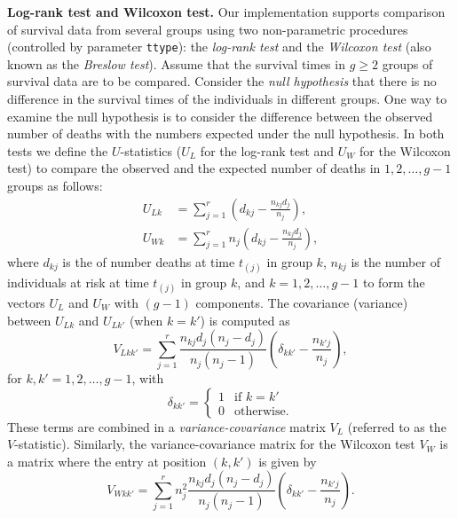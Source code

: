 \textbf{Log-rank test and Wilcoxon test.}
Our implementation supports comparison of survival data from several groups using two non-parametric procedures (controlled by parameter {\tt ttype}): the {\it log-rank test} and the {\it Wilcoxon test} (also known as the {\it Breslow test}). 
Assume that the survival times in $g\geq 2$ groups of survival data are to be compared. 
Consider the {\it null hypothesis} that there is no difference in the survival times of the individuals in different groups. One way to examine the null hypothesis is to consider the difference between the observed number of deaths with the numbers expected under the null hypothesis.  
In both tests we define the $U$-statistics ($U_{L}$ for the log-rank test and $U_{W}$ for the Wilcoxon test) to compare the observed and the expected number of deaths in $1,2,\ldots,g-1$ groups as follows:
\begin{align*}
U_{Lk} &= \sum_{j=1}^{r}\left( d_{kj} - \frac{n_{kj}d_j}{n_j} \right), \\
U_{Wk} &= \sum_{j=1}^{r}n_j\left( d_{kj} - \frac{n_{kj}d_j}{n_j} \right),
\end{align*}
where $d_{kj}$ is the of number deaths at time $t_{(j)}$ in group $k$, 
$n_{kj}$ is the number of individuals at risk at time $t_{(j)}$ in group $k$, and 
$k=1,2,\ldots,g-1$ to form the vectors $U_L$ and $U_W$ with $(g-1)$ components.
The covariance (variance) between $U_{Lk}$ and $U_{Lk'}$ (when $k=k'$) is computed as
\begin{equation*}
V_{Lkk'}=\sum_{j=1}^{r} \frac{n_{kj}d_j(n_j-d_j)}{n_j(n_j-1)} \left( \delta_{kk'}-\frac{n_{k'j}}{n_j} \right),
\end{equation*}
for $k,k'=1,2,\ldots,g-1$, with
\begin{equation*}
\delta_{kk'} = 
\begin{cases}
1 & \text{if } k=k'\\
0 & \text{otherwise.}
\end{cases}
\end{equation*}
These terms are combined in a {\it variance-covariance} matrix $V_L$ (referred to as the $V$-statistic).
Similarly, the variance-covariance matrix for the Wilcoxon test $V_W$ is a matrix where the entry at position $(k,k')$ is given by
\begin{equation*}
V_{Wkk'}=\sum_{j=1}^{r} n_j^2 \frac{n_{kj}d_j(n_j-d_j)}{n_j(n_j-1)} \left( \delta_{kk'}-\frac{n_{k'j}}{n_j} \right).
\end{equation*}

